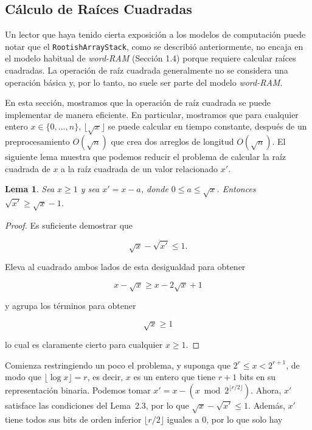 \documentclass[11pt]{book}
\theoremstyle{plain}
\newtheorem{lema}{Lema}[chapter]
\begin{document}
\subsection{Cálculo de Raíces Cuadradas}

Un lector que haya tenido cierta exposición a los modelos de computación puede notar que el \texttt{RootishArrayStack}, como se describió anteriormente, no encaja en el modelo habitual de \emph{word-RAM} (Sección 1.4) porque requiere calcular raíces cuadradas. La operación de raíz cuadrada generalmente no se considera una operación básica y, por lo tanto, no suele ser parte del modelo \emph{word-RAM}.

En esta sección, mostramos que la operación de raíz cuadrada se puede implementar de manera eficiente. En particular, mostramos que para cualquier entero $x \in \{0,...,n\}$, $\lfloor\sqrt{x}\rfloor$ se puede calcular en tiempo constante, después de un preprocesamiento $O(\sqrt{n})$ que crea dos arreglos de longitud $O(\sqrt{n})$. El siguiente lema muestra que podemos reducir el problema de calcular la raíz cuadrada de $x$ a la raíz cuadrada de un valor relacionado $x'$.

\begin{lema}
Sea $x \ge 1$ y sea $x' = x - a$, donde $0 \le a \le \sqrt{x}$. Entonces $\sqrt{x'} \ge \sqrt{x} - 1$.
\end{lema}

\begin{proof}
Es suficiente demostrar que

$$
\sqrt{x} - \sqrt{x'} \le 1 .
$$

Eleva al cuadrado ambos lados de esta desigualdad para obtener

$$
x - \sqrt{x} \ge x - 2\sqrt{x} + 1
$$

y agrupa los términos para obtener

$$
\sqrt{x} \ge 1
$$

lo cual es claramente cierto para cualquier $x \ge 1$.
\end{proof}

Comienza restringiendo un poco el problema, y suponga que $2^r \le x < 2^{r+1}$, de modo que $\lfloor\log x\rfloor = r$, es decir, $x$ es un entero que tiene $r + 1$ bits en su representación binaria. Podemos tomar $x' = x - (x \bmod 2^{\lfloor r/2\rfloor})$. Ahora, $x'$ satisface las condiciones del Lema~2.3, por lo que $\sqrt{x} - \sqrt{x'} \le 1$. Además, $x'$ tiene todos sus bits de orden inferior $\lfloor r/2\rfloor$ iguales a 0, por lo que solo hay
\end{document}
